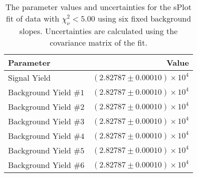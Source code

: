
\begin{table}[ht]
    \begin{center}
        \begin{tabular}{lr}\toprule
            Parameter & Value \\\midrule
            Signal Yield & $(2.82787 \pm 0.00010) \times 10^{4}$ \\
            Background Yield $\#1$ & $(2.82787 \pm 0.00010) \times 10^{4}$ \\
            Background Yield $\#2$ & $(2.82787 \pm 0.00010) \times 10^{4}$ \\
            Background Yield $\#3$ & $(2.82787 \pm 0.00010) \times 10^{4}$ \\
            Background Yield $\#4$ & $(2.82787 \pm 0.00010) \times 10^{4}$ \\
            Background Yield $\#5$ & $(2.82787 \pm 0.00010) \times 10^{4}$ \\
            Background Yield $\#6$ & $(2.82787 \pm 0.00010) \times 10^{4}$ \\\bottomrule
        \end{tabular}
        \caption{The parameter values and uncertainties for the sPlot fit of data with $\chi^2_\nu < 5.00$ using six fixed background slopes. Uncertainties are calculated using the covariance matrix of the fit.}\label{tab:splot-fit-results-chisqdof-5.00-fixed-6}
    \end{center}
\end{table}
